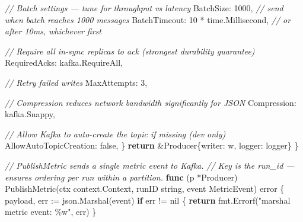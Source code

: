 \documentclass[
]{article}
\newenvironment{Shaded}{}{}
\newcommand{\CommentTok}[1]{\textcolor[rgb]{0.38,0.63,0.69}{\textit{#1}}}
\newcommand{\ControlFlowTok}[1]{\textcolor[rgb]{0.00,0.44,0.13}{\textbf{#1}}}
\newcommand{\DataTypeTok}[1]{\textcolor[rgb]{0.56,0.13,0.00}{#1}}
\newcommand{\DecValTok}[1]{\textcolor[rgb]{0.25,0.63,0.44}{#1}}
\newcommand{\KeywordTok}[1]{\textcolor[rgb]{0.00,0.44,0.13}{\textbf{#1}}}
\newcommand{\NormalTok}[1]{#1}
\newcommand{\OperatorTok}[1]{\textcolor[rgb]{0.40,0.40,0.40}{#1}}
\newcommand{\OtherTok}[1]{\textcolor[rgb]{0.00,0.44,0.13}{#1}}
\newcommand{\StringTok}[1]{\textcolor[rgb]{0.25,0.44,0.63}{#1}}
\begin{document}
\begin{Shaded}
\begin{Highlighting}[]
        \CommentTok{// Batch settings — tune for throughput vs latency}
\NormalTok{        BatchSize}\OperatorTok{:}    \DecValTok{1000}\OperatorTok{,}                  \CommentTok{// send when batch reaches 1000 messages}
\NormalTok{        BatchTimeout}\OperatorTok{:} \DecValTok{10} \OperatorTok{*}\NormalTok{ time}\OperatorTok{.}\NormalTok{Millisecond}\OperatorTok{,} \CommentTok{// or after 10ms, whichever first}

        \CommentTok{// Require all in{-}sync replicas to ack (strongest durability guarantee)}
\NormalTok{        RequiredAcks}\OperatorTok{:}\NormalTok{ kafka}\OperatorTok{.}\NormalTok{RequireAll}\OperatorTok{,}

        \CommentTok{// Retry failed writes}
\NormalTok{        MaxAttempts}\OperatorTok{:} \DecValTok{3}\OperatorTok{,}

        \CommentTok{// Compression reduces network bandwidth significantly for JSON}
\NormalTok{        Compression}\OperatorTok{:}\NormalTok{ kafka}\OperatorTok{.}\NormalTok{Snappy}\OperatorTok{,}

        \CommentTok{// Allow Kafka to auto{-}create the topic if missing (dev only)}
\NormalTok{        AllowAutoTopicCreation}\OperatorTok{:} \OtherTok{false}\OperatorTok{,}
    \OperatorTok{\}}
    \ControlFlowTok{return} \OperatorTok{\&}\NormalTok{Producer}\OperatorTok{\{}\NormalTok{writer}\OperatorTok{:}\NormalTok{ w}\OperatorTok{,}\NormalTok{ logger}\OperatorTok{:}\NormalTok{ logger}\OperatorTok{\}}
\OperatorTok{\}}

\CommentTok{// PublishMetric sends a single metric event to Kafka.}
\CommentTok{// Key is the run\_id — ensures ordering per run within a partition.}
\KeywordTok{func} \OperatorTok{(}\NormalTok{p }\OperatorTok{*}\NormalTok{Producer}\OperatorTok{)}\NormalTok{ PublishMetric}\OperatorTok{(}\NormalTok{ctx context}\OperatorTok{.}\NormalTok{Context}\OperatorTok{,}\NormalTok{ runID }\DataTypeTok{string}\OperatorTok{,}\NormalTok{ event MetricEvent}\OperatorTok{)} \DataTypeTok{error} \OperatorTok{\{}
\NormalTok{    payload}\OperatorTok{,}\NormalTok{ err }\OperatorTok{:=}\NormalTok{ json}\OperatorTok{.}\NormalTok{Marshal}\OperatorTok{(}\NormalTok{event}\OperatorTok{)}
    \ControlFlowTok{if}\NormalTok{ err }\OperatorTok{!=} \OtherTok{nil} \OperatorTok{\{}
        \ControlFlowTok{return}\NormalTok{ fmt}\OperatorTok{.}\NormalTok{Errorf}\OperatorTok{(}\StringTok{"marshal metric event: \%w"}\OperatorTok{,}\NormalTok{ err}\OperatorTok{)}
    \OperatorTok{\}}


\end{Highlighting}
\end{Shaded}
\end{document}
